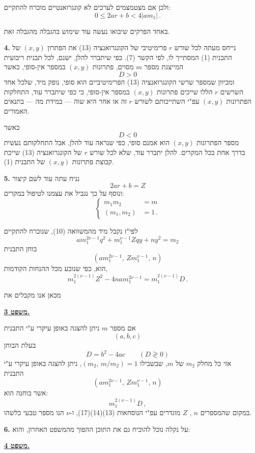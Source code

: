 \noindent ולכן אם מצטמצמים לערכים לא קונגרואנטיים מוכרח להתקיים:
\[ 0 \leq 2ar + b < 4|am_1| \, . \tag{16} \]

\noindent באחד הפרקים שיבואו נעשה עוד שימוש בהגבלה מהגבלה זאת.

\noindent\textbf{4.} נייחס מעתה לכל שורש $r$ פרימיטיבי של הקונגרואנציה (13) את הפתרון $(x,y)$ של התבנית (1) המסתייך לו, לפי הקשר (7). כפי שיתברר להלן, ישנם, לכל תבנית ריבועית המייצגת מספר $m$ מסוים, פתרונות $(x,y)$ במספר אין-סופי, כאשר
\[ D > 0 \]
\noindent ומכיוון שמספר שרשי הקונגרואנציה (13) הפרימיטיביים הוא סופי, נופק מיד, שלכל אחד השרשים $r$ הללו שייכים פתרונות $(x,y)$ במספר אין-סופי, כי כפי שיתברר עוד, התחלקות הפתרונות $(x,y)$ עפ"י השתייכותם לשורש $r$ זה או אחר היא שוה — במידת מה — בתנאים האמורים.

\noindent כאשר
\[ D < 0 \]
\noindent מספר הפתרונות $(x,y)$ הוא אמנם סופי, כפי שנראה עוד להלן, אבל התחלקותם נעשית בדרך אחת בכל המקרים. להלן יתברר עוד, שלא לכל שורש $r$ של הקונגרואנציה (13) שייכת קבוצת פתרונות $(x,y)$ של התבנית (1).

\noindent\textbf{5.} נניח עתה עוד לשם קיצור
\[ 2ar + b = Z \tag{17} \]
\noindent ונוסף על כך נגביל את עצמנו לטיפול במקרים:
\[ \left\{ \begin{aligned} m_1m_2 &= m \\ (m_1,m_2) &= 1 \, . \end{aligned} \right. \tag{18} \]

\noindent לפי"ז נקבל מיד מהמשוואה (10), שנוכרח להתקיים
\[ am_1^{2\nu-1}q^2 + m_1^{\nu-1}Zqy + ny^2 = m_2 \tag{19} \]
\noindent בוחן התבנית
\[ (am_1^{2\nu-1},\, Zm_1^{\nu-1},\, n) \tag{20} \]
\noindent הוא, כפי שנובע מכל ההנחות הקודמות,
\[ m_1^{2(\nu-1)}Z^2 - 4nam_1^{2\nu-1} = m_1^{2(\nu-1)}D \, . \tag{21} \]

\noindent מכאן אנו מקבלים את

\bigskip
\noindent\textbf{\underline{משפט 3.}}

\noindent אם מספר $m$ ניתן להצגה באופן עיקרי ע"י התבנית
\[ (a,b,c) \]
\noindent בעלת הבוחן
\[ D = b^2 - 4ac \qquad (D \gtrless 0) \]
\noindent אזי כל מחלק $m_2$ של $m$, שבשבילו $(m_2,\, m/m_2) = 1$, ניתן להצגה באופן עיקרי ע"י התבנית
\[ (am_1^{2\nu-1},\, Zm_1^{\nu-1},\, n) \]
\noindent אשר בוחנה הוא:
\[ m_1^{2(\nu-1)}D \, , \]
\noindent במקום שהמספרים $n$ , $Z$ מוגדרים עפ"י הנוסחאות (13)(14)(17), ו-$\nu$ הנו מספר טבעי כלשהו.

\bigskip
\noindent\textbf{6.} על נקלה נוכל להוכיח גם את התוכן ההפוך מהמשפט האחרון, והוא:

\bigskip
\noindent\textbf{\underline{משפט 4.}}

